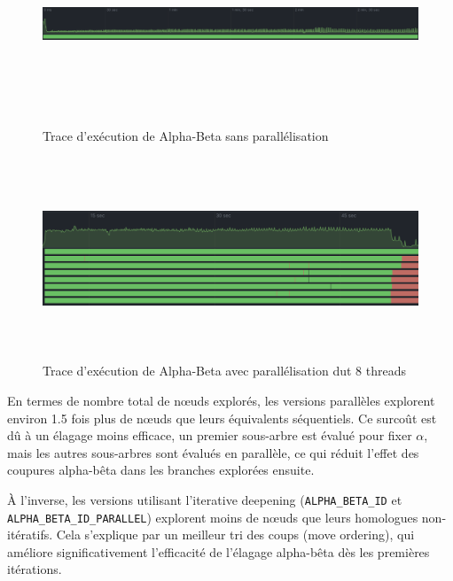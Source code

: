\documentclass{article}
\begin{document}
\begin{figure}[h]
    \centering
    \includegraphics[width=\textwidth,height=6.0cm,keepaspectratio]{without_parallel.png}
    \caption{Trace d'exécution de Alpha-Beta sans parallélisation}
    \label{no_parallel_trace}
\end{figure}

\begin{figure}[h]
    \centering
    \includegraphics[width=\textwidth,height=6.0cm,keepaspectratio]{with_parallel.png}
    \caption{Trace d'exécution de Alpha-Beta avec parallélisation dut 8 threads}
    \label{parallel_trace}
\end{figure}
\FloatBarrier

En termes de nombre total de nœuds explorés, les versions parallèles explorent environ 1.5 fois plus de nœuds que leurs équivalents séquentiels. Ce surcoût est dû à un élagage moins efficace, un premier sous-arbre est évalué pour fixer $\alpha$, mais les autres sous-arbres sont évalués en parallèle, ce qui réduit l'effet des coupures alpha-bêta dans les branches explorées ensuite.

À l'inverse, les versions utilisant l'iterative deepening (\texttt{ALPHA\_BETA\_ID} et \texttt{ALPHA\_BETA\_ID\_PARALLEL}) explorent moins de nœuds que leurs homologues non-itératifs. Cela s'explique par un meilleur tri des coups (move ordering), qui améliore significativement l'efficacité de l'élagage alpha-bêta dès les premières itérations.
\end{document}
